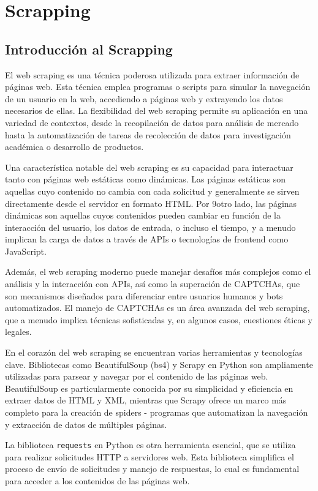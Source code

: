 \chapter{Scrapping}

    \section{Introducción al Scrapping}

    El web scraping es una técnica poderosa utilizada para extraer información de páginas web. Esta técnica emplea programas o scripts para simular la navegación de un usuario en la web, accediendo a páginas web y extrayendo los datos necesarios de ellas. La flexibilidad del web scraping permite su aplicación en una variedad de contextos, desde la recopilación de datos para análisis de mercado hasta la automatización de tareas de recolección de datos para investigación académica o desarrollo de productos.

    Una característica notable del web scraping es su capacidad para interactuar tanto con páginas web estáticas como dinámicas. Las páginas estáticas son aquellas cuyo contenido no cambia con cada solicitud y generalmente se sirven directamente desde el servidor en formato HTML. Por 9otro lado, las páginas dinámicas son aquellas cuyos contenidos pueden cambiar en función de la interacción del usuario, los datos de entrada, o incluso el tiempo, y a menudo implican la carga de datos a través de APIs o tecnologías de frontend como JavaScript.

    Además, el web scraping moderno puede manejar desafíos más complejos como el análisis y la interacción con APIs, así como la superación de CAPTCHAs, que son mecanismos diseñados para diferenciar entre usuarios humanos y bots automatizados. El manejo de CAPTCHAs es un área avanzada del web scraping, que a menudo implica técnicas sofisticadas y, en algunos casos, cuestiones éticas y legales.

    En el corazón del web scraping se encuentran varias herramientas y tecnologías clave. Bibliotecas como BeautifulSoup (bs4) y Scrapy en Python son ampliamente utilizadas para parsear y navegar por el contenido de las páginas web. BeautifulSoup es particularmente conocida por su simplicidad y eficiencia en extraer datos de HTML y XML, mientras que Scrapy ofrece un marco más completo para la creación de spiders - programas que automatizan la navegación y extracción de datos de múltiples páginas.

    La biblioteca \texttt{requests} en Python es otra herramienta esencial, que se utiliza para realizar solicitudes HTTP a servidores web. Esta biblioteca simplifica el proceso de envío de solicitudes y manejo de respuestas, lo cual es fundamental para acceder a los contenidos de las páginas web.

